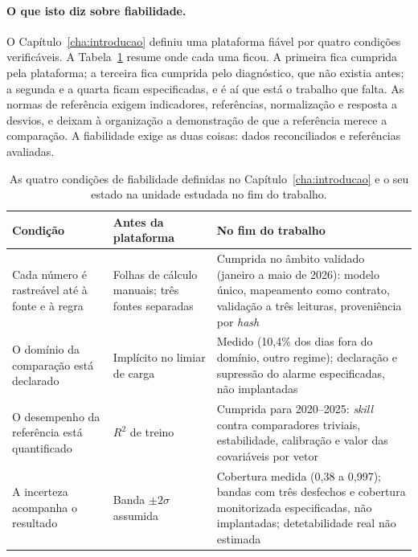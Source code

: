 \paragraph{O que isto diz sobre fiabilidade.} O Capítulo~\ref{cha:introducao}
definiu uma plataforma fiável por quatro condições verificáveis. A
Tabela~\ref{tab:fiabilidade-estado} resume onde cada uma ficou. A primeira
fica cumprida pela plataforma; a terceira fica cumprida pelo diagnóstico, que
não existia antes; a segunda e a quarta ficam especificadas, e é aí que está
o trabalho que falta. As normas de referência exigem indicadores,
referências, normalização e resposta a desvios, e deixam à organização a
demonstração de que a referência merece a comparação. A fiabilidade exige as
duas coisas: dados reconciliados e referências avaliadas.

\begin{table}[htbp]
  \centering\small
  \caption[Condições de fiabilidade: estado no fim do trabalho]{As quatro
  condições de fiabilidade definidas no Capítulo~\ref{cha:introducao} e o seu
  estado na unidade estudada no fim do trabalho.}
  \label{tab:fiabilidade-estado}
  \begin{tabularx}{\textwidth}{@{}>{\raggedright\arraybackslash}p{3.3cm}>{\raggedright\arraybackslash}X>{\raggedright\arraybackslash}X@{}}
    \toprule
    Condição & Antes da plataforma & No fim do trabalho \\
    \midrule
    Cada número é rastreável até à fonte e à regra & Folhas de cálculo manuais; três fontes separadas & Cumprida no âmbito validado (janeiro a maio de 2026): modelo único, mapeamento como contrato, validação a três leituras, proveniência por \emph{hash} \\
    \addlinespace
    O domínio da comparação está declarado & Implícito no limiar de carga & Medido (10,4\% dos dias fora do domínio, outro regime); declaração e supressão do alarme especificadas, não implantadas \\
    \addlinespace
    O desempenho da referência está quantificado & $R^2$ de treino & Cumprida para 2020--2025: \emph{skill} contra comparadores triviais, estabilidade, calibração e valor das covariáveis por vetor \\
    \addlinespace
    A incerteza acompanha o resultado & Banda $\pm2\sigma$ assumida & Cobertura medida (0,38 a 0,997); bandas com três desfechos e cobertura monitorizada especificadas, não implantadas; detetabilidade real não estimada \\
    \bottomrule
  \end{tabularx}
\end{table}

